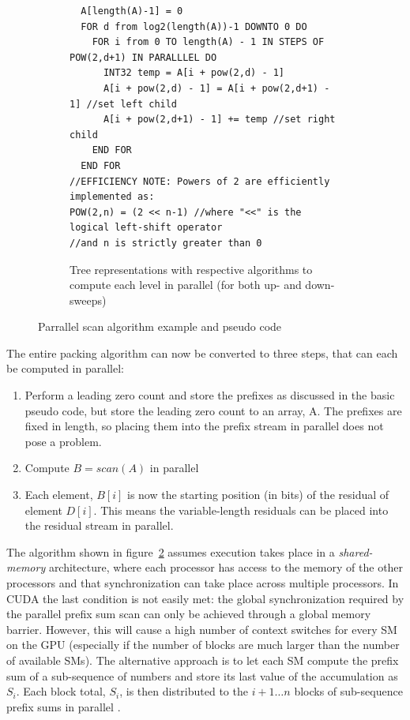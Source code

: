 \begin{figure}[h!]
\begin{mdframed}
\begin{subfigure}[b]{\textwidth}
	\begin{minipage}{\textwidth}
	\begin{lstlisting}
  A[length(A)-1] = 0
  FOR d from log2(length(A))-1 DOWNTO 0 DO
    FOR i from 0 TO length(A) - 1 IN STEPS OF POW(2,d+1) IN PARALLLEL DO
      INT32 temp = A[i + pow(2,d) - 1]
      A[i + pow(2,d) - 1] = A[i + pow(2,d+1) - 1] //set left child
      A[i + pow(2,d+1) - 1] += temp //set right child
    END FOR
  END FOR
//EFFICIENCY NOTE: Powers of 2 are efficiently implemented as:
POW(2,n) = (2 << n-1) //where "<<" is the logical left-shift operator
//and n is strictly greater than 0
      \end{lstlisting}
      \end{minipage}
      
      \caption{Tree representations with respective algorithms to compute each level in parallel (for both up- and down-sweeps)}
      \label{PARALLEL_SCAN_SUB_ALGORITHMS}
    \end{subfigure}
    \caption[Parallel scan algorithm]{Parrallel scan algorithm example and pseudo code \cite{blelloch1990prefix}}
    \label{PARALLEL_SCAN}
  \end{mdframed}
  \end{figure}
 
 The entire packing algorithm can now be converted to three steps, that can each be computed in parallel:
 \begin{enumerate}
  \item Perform a leading zero count and store the prefixes as discussed in the basic pseudo code, but store the leading zero count to an array, A. The prefixes are fixed in length, so placing them
  into the prefix stream in parallel does not pose a problem.
  \item Compute $B = scan(A)$ in parallel
  \item Each element, $B[i]$ is now the starting position (in bits) of the residual of element $D[i]$. This means the variable-length residuals can be placed into the residual stream in parallel.
 \end{enumerate}
 
 The algorithm shown in figure~\ref{PARALLEL_SCAN} assumes execution takes place in a \textit{shared-memory} architecture, where each processor has access to the memory of the other processors and that synchronization
 can take place across multiple processors. In CUDA the last condition is not easily met: the global synchronization required by the parallel prefix sum scan can only be achieved through a global memory barrier. 
 However, this will cause a high number of context switches for every SM on the GPU (especially if the number of blocks are much larger than the number of available SMs). The alternative approach is to let each SM
 compute the prefix sum of a sub-sequence of numbers and store its last value of the accumulation as $S_{i}$. Each block total, $S_{i}$, is then distributed to the $i+1\dots n$ blocks of sub-sequence prefix sums in 
 parallel \cite{harris2007parallel}.
 
